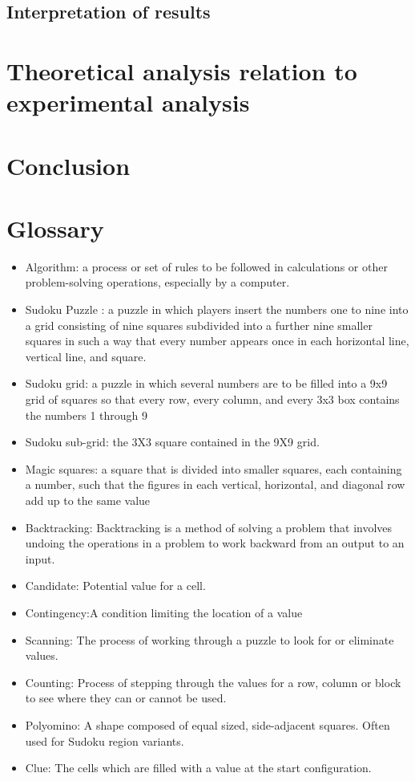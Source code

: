 \documentclass[12pt]{article}
\begin{document}
\subsection{Interpretation of results}
\section{Theoretical analysis relation to experimental analysis}
\section{Conclusion}

\section{Glossary}
\begin{itemize}
\item Algorithm: a process or set of rules to be followed in calculations or other problem-solving operations, especially by a computer.
\item Sudoku Puzzle : a puzzle in which players insert the numbers one to nine into a grid consisting of nine squares subdivided into a further nine smaller squares in such a way that every number appears once in each horizontal line, vertical line, and square.
\item Sudoku grid:  a puzzle in which several numbers are to be filled into a 9x9 grid of squares so that every row, every column, and every 3x3 box contains the numbers 1 through 9
\item Sudoku sub-grid: the 3X3 square contained in the 9X9 grid.
\item Magic squares: a square that is divided into smaller squares, each containing a number, such that the figures in each vertical, horizontal, and diagonal row add up to the same value
\item Backtracking: Backtracking is a method of solving a problem that involves undoing the operations in a problem to work backward from an output to an input.
\item Candidate: Potential value for a cell.
\item Contingency:A condition limiting the location of a value
\item Scanning: The process of working through a puzzle to look for or eliminate values.
\item Counting: Process of stepping through the values for a row, column or block to see where they can or cannot be used.
\item Polyomino:
A shape composed of equal sized, side-adjacent squares. Often used for Sudoku region variants.
\item Clue: The cells which are filled with a value at the start configuration.

\end{itemize}
\end{document}
